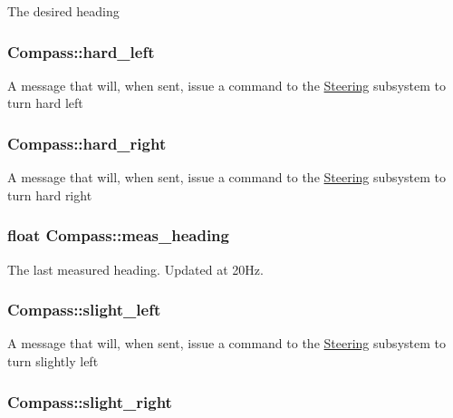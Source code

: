 The desired heading \hypertarget{classCompass_a5cbc2cebdd91222c5ccf5bd28aa35ced}{
\subsubsection[{hard\-\_\-left}]{ Compass\-::hard\-\_\-left}}\label{classCompass_a5cbc2cebdd91222c5ccf5bd28aa35ced}
A message that will, when sent, issue a command to the \hyperlink{classSteering}{Steering} subsystem to turn hard left \hypertarget{classCompass_a15cd7eda15b824c8d5821a46667b861c}{
\subsubsection[{hard\-\_\-right}]{ Compass\-::hard\-\_\-right}}\label{classCompass_a15cd7eda15b824c8d5821a46667b861c}
A message that will, when sent, issue a command to the \hyperlink{classSteering}{Steering} subsystem to turn hard right \hypertarget{classCompass_af0f87a131e2c9833f7d52bed1a39bf75}{
\subsubsection[{meas\-\_\-heading}]{\setlength{\rightskip}{0pt plus 5cm}float Compass\-::meas\-\_\-heading\hspace{0.3cm}{\ttfamily [protected]}}}\label{classCompass_af0f87a131e2c9833f7d52bed1a39bf75}
The last measured heading. Updated at 20\-Hz. \hypertarget{classCompass_a9e0a282c1253451fd7967646074102ee}{
\subsubsection[{slight\-\_\-left}]{ Compass\-::slight\-\_\-left}}\label{classCompass_a9e0a282c1253451fd7967646074102ee}
A message that will, when sent, issue a command to the \hyperlink{classSteering}{Steering} subsystem to turn slightly left \hypertarget{classCompass_a9e9ff6610d60e6fd915984a3f3e40e13}{
\subsubsection[{slight\-\_\-right}]{ Compass\-::slight\-\_\-right}}\label{classCompass_a9e9ff6610d60e6fd915984a3f3e40e13}
